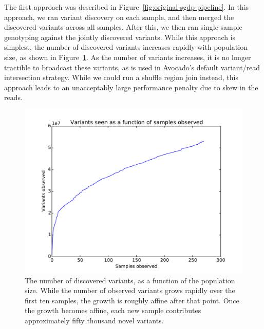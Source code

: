 \documentclass[phd]{ucbthesis}
\begin{document}
The first approach was described in Figure~\ref{fig:original-sgdp-pipeline}. In
this approach, we ran variant discovery on each sample, and then merged the
discovered variants across all samples. After this, we then ran single-sample
genotyping against the jointly discovered variants. While this approach is
simplest, the number of discovered variants increases rapidly with population
size, as shown in Figure~\ref{fig:variants-in-population}. As the number of
variants increases, it is no longer tractible to broadcast these variants, as
is used in Avocado's default variant/read intersection strategy. While we could
run a shuffle region join instead, this approach leads to an unacceptably large
performance penalty due to skew in the reads.

\begin{figure}[h]
  \begin{center}
    \includegraphics[width=0.95\linewidth]{graphs/variant_counts.pdf}
  \end{center}
  \caption{The number of discovered variants, as a function of the population
    size. While the number of observed variants grows rapidly over the first
    ten samples, the growth is roughly affine after that point. Once the
    growth becomes affine, each new sample contributes approximately fifty
    thousand novel variants.}
  \label{fig:variants-in-population}
\end{figure}
\end{document}
